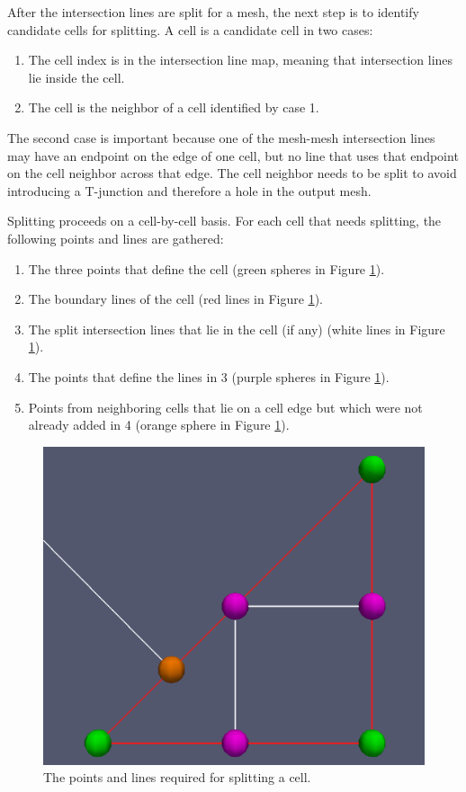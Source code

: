 \documentclass{InsightArticle}
\begin{document}
After the intersection lines are split for a mesh, the next step is to identify candidate cells for splitting. A cell is a candidate cell in two cases:

\begin{enumerate}
\item The cell index is in the intersection line map, meaning that intersection lines lie inside the cell.
\item The cell is the neighbor of a cell identified by case 1.
\end{enumerate}

The second case is important because one of the mesh-mesh intersection lines may have an endpoint on the edge of one cell, but no line that uses that endpoint on the cell neighbor across that edge. The cell neighbor needs to be split to avoid introducing a T-junction and therefore a hole in the output mesh.

Splitting proceeds on a cell-by-cell basis. For each cell that needs splitting, the following points and lines are gathered:

\begin{enumerate}
\item The three points that define the cell (green spheres in Figure \ref{fig:CellSplitSetup}).
\item The boundary lines of the cell (red lines in Figure \ref{fig:CellSplitSetup}).
\item The split intersection lines that lie in the cell (if any) (white lines in Figure \ref{fig:CellSplitSetup}).
\item The points that define the lines in 3 (purple spheres in Figure \ref{fig:CellSplitSetup}).
\item Points from neighboring cells that lie on a cell edge but which were not already added in 4 (orange sphere in Figure \ref{fig:CellSplitSetup}).
\end{enumerate}

\begin{figure}
\centering
\includegraphics[scale=0.25]{Figures/CellSplitSetup}
\caption{The points and lines required for splitting a cell.}
\label{fig:CellSplitSetup}
\end{figure}
\end{document}
